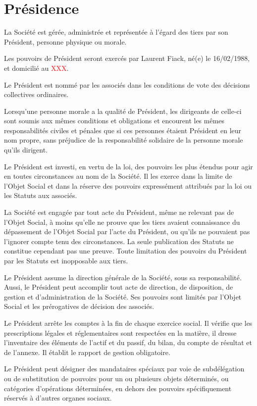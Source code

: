 \documentclass[a4paper,12pt]{report}
\begin{document}
\section{Présidence}
La Société est gérée, administrée et représentée à l'égard des tiers par son Président, personne physique ou morale.

Les pouvoirs de Président seront exercés par Laurent Fiack, né(e) le 16/02/1988, et domicilié au \textcolor{red}{XXX}.

Le Président est nommé par les associés dans les conditions de vote des décisions collectives ordinaires.

Lorsqu'une personne morale a la qualité de Président, les dirigeants de celle-ci sont soumis aux mêmes conditions et obligations 
et encourent les mêmes responsabilités civiles et pénales que si ces personnes étaient Président en leur nom propre, 
sans préjudice de la responsabilité solidaire de la personne morale qu'ils dirigent.

Le Président est investi, en vertu de la loi, des pouvoirs les plus étendus pour agir en toutes circonstances au nom de la Société. 
Il les exerce dans la limite de l'Objet Social et dans la réserve des pouvoirs expressément attribués par la loi ou les Statuts aux associés.

La Société est engagée par tout acte du Président, même ne relevant pas de l'Objet Social, 
à moins qu'elle ne prouve que les tiers avaient connaissance du dépassement de l'Objet Social par l'acte du Président, 
ou qu'ils ne pouvaient pas l'ignorer compte tenu des circonstances. 
La seule publication des Statuts ne constitue cependant pas une preuve. 
Toute limitation des pouvoirs du Président par les Statuts est inopposable aux tiers.

Le Président assume la direction générale de la Société, sous sa responsabilité. 
Aussi, le Président peut accomplir tout acte de direction, de disposition, de gestion et d'administration de la Société. 
Ses pouvoirs sont limités par l'Objet Social et les prérogatives de décision des associés.

Le Président arrête les comptes à la fin de chaque exercice social. 
Il vérifie que les prescriptions légales et réglementaires sont respectées en la matière, 
il dresse l'inventaire des éléments de l'actif et du passif, du bilan, du compte de résultat et de l'annexe. 
Il établit le rapport de gestion obligatoire.

Le Président peut désigner des mandataires spéciaux par voie de subdélégation ou de substitution de pouvoirs pour un ou plusieurs objets déterminés, 
ou catégories d'opérations déterminées, en dehors des pouvoirs spécifiquement réservés à d'autres organes sociaux.
\end{document}
